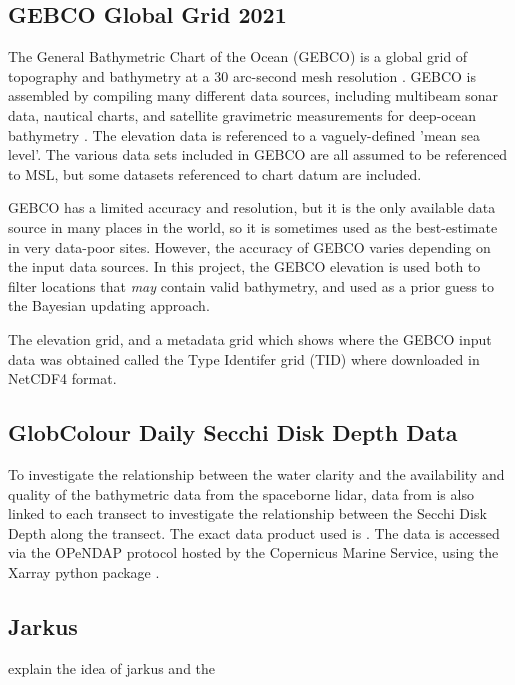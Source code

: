 \subsection{GEBCO Global Grid 2021}

The General Bathymetric Chart of the Ocean (GEBCO) is a global grid of topography and bathymetry at a 30 arc-second mesh resolution \parencite{gebco2021griddata}. GEBCO is assembled by compiling many different data sources, including multibeam sonar data, nautical charts, and satellite gravimetric measurements for deep-ocean bathymetry \parencite{gebcocookbook}. The elevation data is referenced to a vaguely-defined 'mean sea level'. The various data sets included in GEBCO are all assumed to be referenced to MSL, but some datasets referenced to chart datum are included. 

GEBCO has a limited accuracy and resolution, but it is the only available data source in many places in the world, so it is sometimes used as the best-estimate in very data-poor sites. However, the accuracy of GEBCO varies depending on the input data sources. In this project, the GEBCO elevation is used both to filter locations that \emph{may} contain valid bathymetry, and used as a prior guess to the Bayesian updating approach. 

The elevation grid, and a metadata grid which shows where the GEBCO input data was obtained called the Type Identifer grid (TID) where downloaded in NetCDF4 format.


\subsection{GlobColour Daily Secchi Disk Depth Data}

To investigate the relationship between the water clarity and the availability and quality of the bathymetric data from the spaceborne lidar, data from \citeauthor{Garnesson2019} is also linked to each transect to investigate the relationship between the Secchi Disk Depth along the transect. The exact data product used is \cite{Garnesson2019}. The data is accessed via the OPeNDAP protocol hosted by the Copernicus Marine Service, using the Xarray python package \parencite{hoyer_stephan_2022_6323468,hoyer2017xarray}.


\subsection{Jarkus}

explain the idea of jarkus and the 
